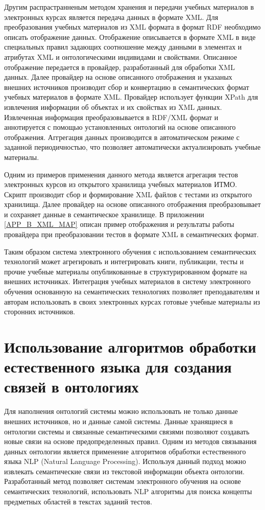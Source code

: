 Другим распрастранненым методом хранения и передачи учебных материалов в электронных курсах является передача данных в формате XML. Для преобразования учебных материалов из XML формата в формат RDF необходимо описать отображение данных. Отображение описывается в формате XML в виде специальных правил задающих соотношение между данными в элементах и атрибутах XML и онтологическими индивидами и свойствами. Описанное отображение передается в провайдер, разработанный для обработки XML данных. Далее провайдер на основе описанного отображения и указаных внешних источников производит сбор и конвертацию в семантических формат учебных материалов в формате XML. Провайдер использует функции XPath для извлечения информации об объектах и их свойствах из XML данных. Извлеченная информация преобразовывается в RDF/XML формат и аннотируется с помощью установленных онтологий на основе описанного отображения. Аггрегация данных производится в автоматическом режиме с заданной периодичностью, что позволяет автоматически актуализировать учебные материалы.

Одним из примеров применения данного метода является агрегация тестов электронных курсов из открытого хранилища учебных материалов ИТМО. Скрипт производит сбор и формирование XML файлов с тестами из открытого хранилища. Далее провайдер на основе описанного отображения преобразовывает и сохраняет данные в семантическое хранилище. В приложении \ref{APP_B_XML_MAP} описан пример отображения и результаты работы провайдера при преобразовании тестов в формате XML в семантических формат.

Таким образом система электронного обучения с использованием семантических технологий может агрегировать и интегрировать книги, публикации, тесты и прочие учебные материалы опубликованные в структурированном формате на внешних источниках. Интеграция учебных материалов в систему электронного обучения основанную на семантических технологиях позволяет преподавателям и авторам использовать в своих электронных курсах готовые учебные материалы из сторонних источников.  


\section{Использование алгоритмов обработки естественного языка для создания связей в онтологиях} \label{sect3_3}

Для наполнения онтологий системы можно использовать не только данные внешних источников, но и данные самой системы. Данные хранящиеся в онтологии системы и связанные семантическими связями позволяют создавать новые связи на основе предопределенных правил. Одним из методов связывания данных онтологии является применение алгоритмов обработки естественного языка NLP (Natural Language Processing). Используя данный подход можно извлекать семантические связи из текстовой информации объекта онтологии. Разработанный метод позволяет системам электронного обучения на основе семантических технологий, использовать NLP алгоритмы для поиска концепты предметных областей в текстах заданий тестов.


